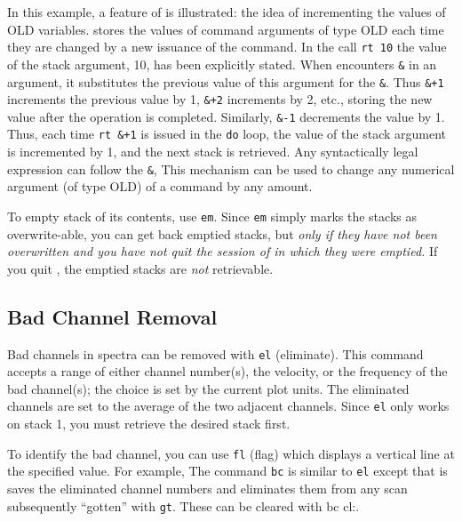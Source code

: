 In this example, a feature of \COMB is illustrated: the idea of
incrementing the values of OLD variables.  \COMB stores the values of
command arguments of type OLD each time they are changed by a new issuance of 
the command.  In the call {\tt rt 10} the value of the stack argument, 10, 
has been explicitly stated. 
When \COMB encounters {\tt \&} in an argument, it substitutes the previous value
of this argument for the {\tt \&}.
Thus {\tt \&+1}  increments the previous value by 1, 
{\tt \&+2} increments by 2, etc., storing the new value after the operation 
is completed.  Similarly, {\tt \&-1} decrements the value by 1.
Thus, each time {\tt rt \&+1} is issued in the {\tt do} loop, the value of 
the stack argument is incremented by 1, and the next stack is retrieved.
Any syntactically legal expression can follow the {\tt \&}, 
\smallskip
{}
\smallskip\noindent
This mechanism can be used to change any numerical 
argument (of type OLD) of a command by any amount. 

To empty stack of its contents, use {\tt em}. 
\smallskip
{}
\smallskip\noindent
Since {\tt em} simply marks the stacks as overwrite-able, you
can get back emptied stacks, but {\em only if they have not
been overwritten and you have not quit the session of \COMB 
in which they were emptied.} If you quit \C, the emptied
stacks are {\em not\/} retrievable.
\smallskip
{}

\subsection{Bad Channel Removal}
 
Bad channels in spectra can be removed with {\tt el}
(eliminate).  This command accepts a range of either channel number(s),
the velocity, or the frequency of the bad channel(s); the choice is set
by the current plot units. The eliminated channels are set to the
average of the two adjacent channels. Since {\tt el} only works on
stack 1, you must retrieve the desired stack first.
 
To identify the bad channel, you can use {\tt fl} (flag) which displays
a vertical line at the specified value.  For example,
\smallskip
The command {\tt bc} is similar to {\tt el} except that is saves the eliminated
channel numbers and eliminates them from any scan subsequently
``gotten'' with {\tt gt}. These can be cleared with {\us bc cl:}.

